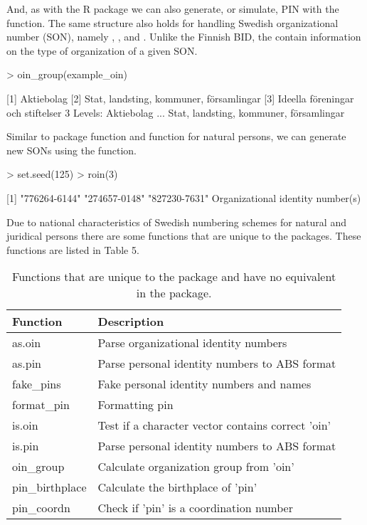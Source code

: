 And, as with the  R package we can also generate, or simulate, PIN with the  function. The same structure also holds for handling Swedish organizational number (SON), namely , , and . Unlike the Finnish BID, the  contain information on the type of organization of a given SON.

\begin{example}
  > oin_group(example\_oin)

  [1] Aktiebolag
  [2] Stat, landsting, kommuner, församlingar
  [3] Ideella föreningar och stiftelser
  3 Levels: Aktiebolag ... Stat, landsting, kommuner, församlingar
\end{example}

Similar to  package  function and   function for natural persons, we can generate new SONs using the  function.

\begin{example}
  > set.seed(125)
  > roin(3)

  [1] "776264-6144" "274657-0148" "827230-7631"
  Organizational identity number(s)
\end{example}

Due to national characteristics of Swedish numbering schemes for natural and juridical persons there are some functions that are unique to the  packages. These functions are listed in Table 5.

\begin{table}[ht]
\centering
\begin{tabular}{ll}
\toprule
    Function & Description \\
  \hline
  as.oin & Parse organizational identity numbers \\
  as.pin & Parse personal identity numbers to ABS format \\
  fake\_pins & Fake personal identity numbers and names \\
  format\_pin & Formatting pin \\
  is.oin & Test if a character vector contains correct 'oin' \\
  is.pin & Parse personal identity numbers to ABS format \\
  oin\_group & Calculate organization group from 'oin' \\
  pin\_birthplace & Calculate the birthplace of 'pin' \\
  pin\_coordn & Check if 'pin' is a coordination number \\
\bottomrule
\end{tabular}
\caption{Functions that are unique to the  package and have no equivalent in the  package.}
\label{tab:hetudiagnostics}
\end{table}


